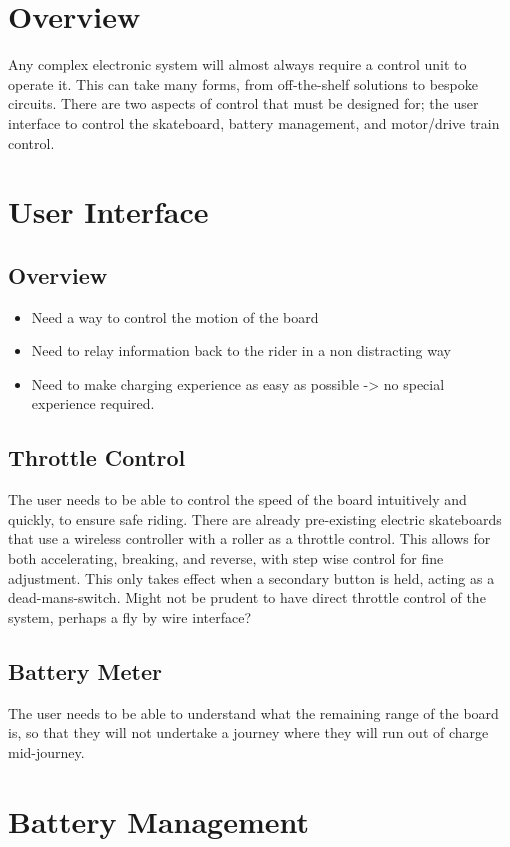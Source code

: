 \documentclass[journal,10pt]{IEEEtran}
\begin{document}
\section{Overview}
	Any complex electronic system will almost always require a control unit to operate it. This can take many forms, from off-the-shelf solutions to bespoke circuits.
	There are two aspects of control that must be designed for; the user interface to control the skateboard, battery management, and motor/drive train control.
\section{User Interface}
	\subsection{Overview}
		\begin{itemize}
			\item Need a way to control the motion of the board
			\item Need to relay information back to the rider in a non distracting way
			\item Need to make charging experience as easy as possible -> no special experience required.
		\end{itemize}
	\subsection{Throttle Control}
		The user needs to be able to control the speed of the board intuitively and quickly, to ensure safe riding.
		There are already pre-existing electric skateboards that use a wireless controller with a roller as a throttle control. 
		This allows for both accelerating, breaking, and reverse, with step wise control for fine adjustment.
		This only takes effect when a secondary button is held, acting as a dead-mans-switch.
		Might not be prudent to have direct throttle control of the system, perhaps a fly by wire interface?
	\subsection{Battery Meter}
		The user needs to be able to understand what the remaining range of the board is, so that they will not undertake a journey where they will run out of charge mid-journey.
\section{Battery Management}
\end{document}
